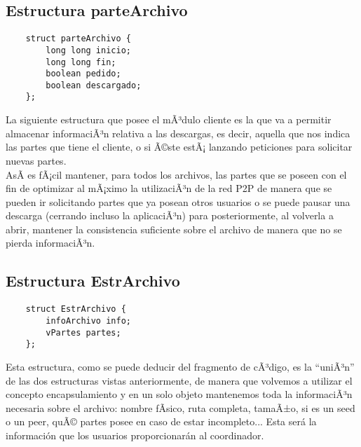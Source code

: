       \subsection{Estructura parteArchivo}
      \begin{center}
         \begin{verbatim}
	struct parteArchivo {
		long long inicio;
		long long fin;
		boolean pedido;
		boolean descargado;
	};
         \end{verbatim}
      \end{center}
      La siguiente estructura que posee el mÃ³dulo cliente es la que va a permitir almacenar informaciÃ³n relativa a las descargas, es decir, aquella
      que nos indica las partes que tiene el cliente, o si Ã©ste estÃ¡ lanzando peticiones para solicitar nuevas partes.\\

      AsÃ­ es fÃ¡cil mantener, para todos los archivos, las partes que se poseen con el fin de optimizar al mÃ¡ximo la utilizaciÃ³n de la red P2P de 
      manera que se pueden ir solicitando partes que ya posean otros usuarios o se puede pausar una descarga (cerrando incluso la aplicaciÃ³n) para
      posteriormente, al volverla a abrir, mantener la consistencia suficiente sobre el archivo de manera que no se pierda informaciÃ³n.\\

      \subsection{Estructura EstrArchivo}
      \begin{center}
         \begin{verbatim}
	struct EstrArchivo {
		infoArchivo info;
		vPartes partes;
	};
         \end{verbatim}
      \end{center}      
      Esta estructura, como se puede deducir del fragmento de cÃ³digo, es la ``uniÃ³n'' de las dos estructuras vistas anteriormente, de manera que
      volvemos a utilizar el concepto encapsulamiento y en un solo objeto mantenemos toda la informaciÃ³n necesaria sobre el archivo: nombre fÃ­sico,
      ruta completa, tamaÃ±o, si es un seed o un peer, quÃ© partes posee en caso de estar incompleto... Esta será la información que los usuarios 
      proporcionarán al coordinador.\\

